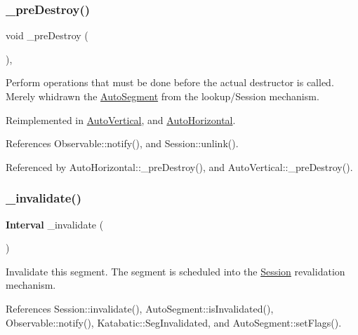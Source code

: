 \subsubsection{\texorpdfstring{\+\_\+pre\+Destroy()}{\_preDestroy()}}
{\footnotesize\ttfamily void \+\_\+pre\+Destroy (\begin{DoxyParamCaption}{ }\end{DoxyParamCaption})\hspace{0.3cm}{\ttfamily [protected]}, {\ttfamily [virtual]}}

Perform operations that must be done before the actual destructor is called. Merely whidrawn the \mbox{\hyperlink{classKatabatic_1_1AutoSegment}{Auto\+Segment}} from the lookup/\+Session mechanism. 

Reimplemented in \mbox{\hyperlink{classKatabatic_1_1AutoVertical_a7c13d9795eafd477994961f8a0d962d0}{Auto\+Vertical}}, and \mbox{\hyperlink{classKatabatic_1_1AutoHorizontal_a7c13d9795eafd477994961f8a0d962d0}{Auto\+Horizontal}}.



References Observable\+::notify(), and Session\+::unlink().



Referenced by Auto\+Horizontal\+::\+\_\+pre\+Destroy(), and Auto\+Vertical\+::\+\_\+pre\+Destroy().

\mbox{\label{classKatabatic_1_1AutoSegment_a6a98d2e5839b880893703ad45db4e4c4}} 
\subsubsection{\texorpdfstring{\+\_\+invalidate()}{\_invalidate()}}
{\footnotesize\ttfamily \textbf{ Interval} \+\_\+invalidate (\begin{DoxyParamCaption}{ }\end{DoxyParamCaption})\hspace{0.3cm}{\ttfamily [protected]}}

Invalidate this segment. The segment is scheduled into the \mbox{\hyperlink{classKatabatic_1_1Session}{Session}} revalidation mechanism. 

References Session\+::invalidate(), Auto\+Segment\+::is\+Invalidated(), Observable\+::notify(), Katabatic\+::\+Seg\+Invalidated, and Auto\+Segment\+::set\+Flags().



